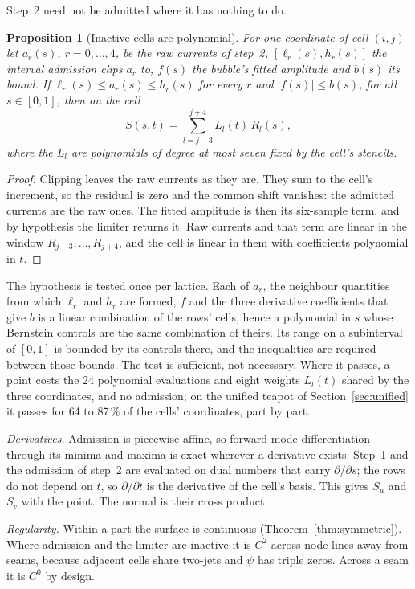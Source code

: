 \documentclass[journal]{IEEEtran}
\newtheorem{proposition}{Proposition}
\begin{document}
Step~2 need not be admitted where it has nothing to do.

\begin{proposition}[Inactive cells are polynomial]
\label{prop:inactive}
For one coordinate of cell $(i,j)$ let $a_r(s)$, $r=0,\ldots,4$, be the
raw currents of step~2, $[\ell_r(s),h_r(s)]$ the interval admission clips
$a_r$ to, $f(s)$ the bubble's fitted amplitude and $b(s)$ its bound. If
$\ell_r(s)\le a_r(s)\le h_r(s)$ for every $r$ and $|f(s)|\le b(s)$, for
all $s\in[0,1]$, then on the cell
\[ S(s,t)=\sum_{l=j-3}^{j+4} L_l(t)\,R_l(s), \]
where the $L_l$ are polynomials of degree at most seven fixed by the
cell's stencils.
\end{proposition}
\begin{proof}
Clipping leaves the raw currents as they are. They sum to the cell's
increment, so the residual is zero and the common shift vanishes: the
admitted currents are the raw ones. The fitted amplitude is then its
six-sample term, and by hypothesis the limiter returns it. Raw currents
and that term are linear in the window $R_{j-3},\ldots,R_{j+4}$, and the
cell is linear in them with coefficients polynomial in $t$.
\end{proof}

The hypothesis is tested once per lattice. Each of $a_r$, the neighbour
quantities from which $\ell_r$ and $h_r$ are formed, $f$ and the three
derivative coefficients that give $b$ is a linear combination of the
rows' cells, hence a polynomial in $s$ whose Bernstein controls are the
same combination of theirs. Its range on a subinterval of $[0,1]$ is
bounded by its controls there, and the inequalities are required between
those bounds. The test is sufficient, not necessary. Where it passes, a
point costs the 24 polynomial evaluations and eight weights $L_l(t)$
shared by the three coordinates, and no admission; on the unified teapot
of Section~\ref{sec:unified} it passes for 64 to 87\,\% of the cells'
coordinates, part by part.

\emph{Derivatives.} Admission is piecewise affine, so forward-mode
differentiation through its minima and maxima is exact wherever a
derivative exists. Step~1 and the admission of step~2 are evaluated on
dual numbers that carry $\partial/\partial s$; the rows do not depend on
$t$, so $\partial/\partial t$ is the derivative of the cell's basis.
This gives $S_u$ and $S_v$ with the point. The normal is their cross
product.

\emph{Regularity.} Within a part the surface is continuous
(Theorem~\ref{thm:symmetric}). Where admission and the limiter are
inactive it is $C^2$ across node lines away from seams, because adjacent
cells share two-jets and $\psi$ has triple zeros. Across a seam it is
$C^0$ by design.
\end{document}
